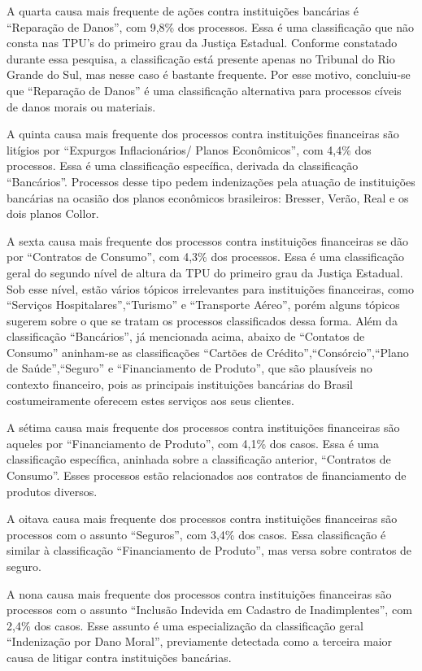 \documentclass[]{report}
\begin{document}
A quarta causa mais frequente de ações contra instituições bancárias é
``Reparação de Danos'', com 9,8\% dos processos. Essa é uma
classificação que não consta nas TPU's do primeiro grau da Justiça
Estadual. Conforme constatado durante essa pesquisa, a classificação
está presente apenas no Tribunal do Rio Grande do Sul, mas nesse caso é
bastante frequente. Por esse motivo, concluiu-se que ``Reparação de
Danos'' é uma classificação alternativa para processos cíveis de danos
morais ou materiais.

A quinta causa mais frequente dos processos contra instituições
financeiras são litígios por ``Expurgos Inflacionários/ Planos
Econômicos'', com 4,4\% dos processos. Essa é uma classificação
específica, derivada da classificação ``Bancários''. Processos desse
tipo pedem indenizações pela atuação de instituições bancárias na
ocasião dos planos econômicos brasileiros: Bresser, Verão, Real e os
dois planos Collor.

A sexta causa mais frequente dos processos contra instituições
financeiras se dão por ``Contratos de Consumo'', com 4,3\% dos
processos. Essa é uma classificação geral do segundo nível de altura da
TPU do primeiro grau da Justiça Estadual. Sob esse nível, estão vários
tópicos irrelevantes para instituições financeiras, como ``Serviços
Hospitalares'',``Turismo'' e ``Transporte Aéreo'', porém alguns tópicos
sugerem sobre o que se tratam os processos classificados dessa forma.
Além da classificação ``Bancários'', já mencionada acima, abaixo de
``Contatos de Consumo'' aninham-se as classificações ``Cartões de
Crédito'',``Consórcio'',``Plano de Saúde'',``Seguro'' e ``Financiamento
de Produto'', que são plausíveis no contexto financeiro, pois as
principais instituições bancárias do Brasil costumeiramente oferecem
estes serviços aos seus clientes.

A sétima causa mais frequente dos processos contra instituições
financeiras são aqueles por ``Financiamento de Produto'', com 4,1\% dos
casos. Essa é uma classificação específica, aninhada sobre a
classificação anterior, ``Contratos de Consumo''. Esses processos estão
relacionados aos contratos de financiamento de produtos diversos.

A oitava causa mais frequente dos processos contra instituições
financeiras são processos com o assunto ``Seguros'', com 3,4\% dos
casos. Essa classificação é similar à classificação ``Financiamento de
Produto'', mas versa sobre contratos de seguro.

A nona causa mais frequente dos processos contra instituições
financeiras são processos com o assunto ``Inclusão Indevida em Cadastro
de Inadimplentes'', com 2,4\% dos casos. Esse assunto é uma
especialização da classificação geral ``Indenização por Dano Moral'',
previamente detectada como a terceira maior causa de litigar contra
instituições bancárias.
\end{document}
